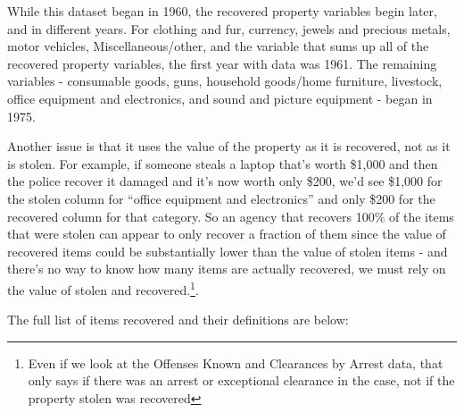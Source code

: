\documentclass[
  12pt,
  openany]{book}
\begin{document}
While this dataset began in 1960, the recovered property variables begin later, and in different years. For clothing and fur, currency, jewels and precious metals, motor vehicles, Miscellaneous/other, and the variable that sums up all of the recovered property variables, the first year with data was 1961. The remaining variables - consumable goods, guns, household goods/home furniture, livestock, office equipment and electronics, and sound and picture equipment - began in 1975.

Another issue is that it uses the value of the property as it is recovered, not as it is stolen. For example, if someone steals a laptop that's worth \$1,000 and then the police recover it damaged and it's now worth only \$200, we'd see \$1,000 for the stolen column for ``office equipment and electronics'' and only \$200 for the recovered column for that category. So an agency that recovers 100\% of the items that were stolen can appear to only recover a fraction of them since the value of recovered items could be substantially lower than the value of stolen items - and there's no way to know how many items are actually recovered, we must rely on the value of stolen and recovered.\footnote{Even if we look at the Offenses Known and Clearances by Arrest data, that only says if there was an arrest or exceptional clearance in the case, not if the property stolen was recovered}.

The full list of items recovered and their definitions are below:
\end{document}
